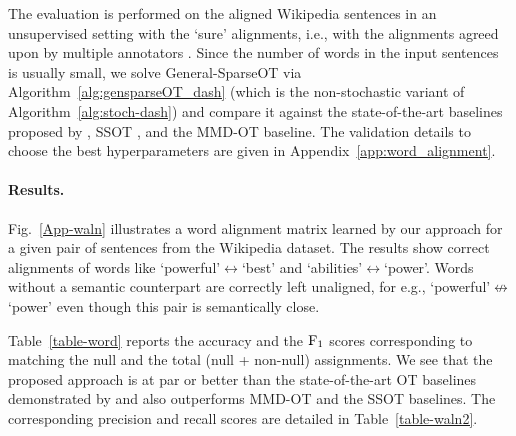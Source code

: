  The evaluation is performed on the aligned Wikipedia sentences in an unsupervised setting with the `sure' alignments, i.e., with the alignments agreed upon by multiple annotators \citep{arase-etal-2023-unbalanced}. 
Since the number of words in the input sentences is usually small, we solve General-SparseOT via Algorithm~\ref{alg:gensparseOT_dash} (which is the non-stochastic variant of Algorithm~\ref{alg:stoch-dash}) and compare it against the state-of-the-art baselines proposed by \citet{arase-etal-2023-unbalanced}, SSOT \citep{blondel18a}, and the MMD-OT \citep{mmd-uot} baseline. 
The validation details to choose the best hyperparameters are given in Appendix~\ref{app:word_alignment}.


\paragraph{Results.} Fig.~\ref{App-waln} illustrates a word alignment matrix learned by our approach for a given pair of sentences from the Wikipedia dataset. The results show correct alignments of words like `powerful'$\leftrightarrow$`best' and `abilities'$\leftrightarrow$`power'. Words without a semantic counterpart are correctly left unaligned, for e.g., `powerful'$\not \leftrightarrow$`power' even though this pair is semantically close.


Table~\ref{table-word} reports the accuracy and the $\rm{F}_1$ scores corresponding to matching the null and the total (null + non-null) assignments. 
We see that the proposed approach is at par or better than the state-of-the-art OT baselines demonstrated by \citet{arase-etal-2023-unbalanced} and also outperforms MMD-OT and the SSOT baselines. 
The corresponding precision and recall scores are detailed in Table~\ref{table-waln2}. 


